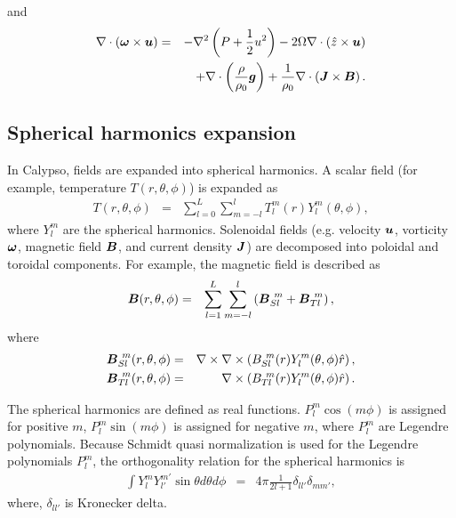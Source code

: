 %
and
\begin{eqnarray}
\nabla \cdot \left(\mbox{\boldmath$\omega$} \times \mbox{\boldmath$u$}\right)
 & = & -\nabla^{2} \left(P+\frac{1}{2}u^{2} \right) - 2 \Omega \nabla \cdot \left(\hat{z} \times \mbox{\boldmath$u$} \right)
\nonumber \\
 & & + \nabla \cdot \left( \frac{\rho}{\rho_{0}} \mbox{\boldmath$g$} \right)
     + \frac{1}{\rho_{0}} \nabla \cdot \left(\mbox{\boldmath$J$} \times \mbox{\boldmath$B$} \right)
\nonumber.
\end{eqnarray}


\subsection{Spherical harmonics expansion}
In Calypso, fields are expanded into spherical harmonics. A scalar field (for example, temperature $T(r, \theta, \phi)$) is expanded as
%
\begin{eqnarray}
T(r, \theta, \phi) &=& \sum_{l=0}^{L} \sum_{m=-l}^{l} T_{l}^{m}(r) Y_{l}^{m}(\theta,\phi),
\nonumber
\end{eqnarray}
where  $Y_{l}^{m}$ are the spherical harmonics. Solenoidal fields (e.g. velocity $\mbox{\boldmath$u$}$, vorticity $\mbox{\boldmath$\omega$}$, magnetic field $\mbox{\boldmath$B$}$, and current density $\mbox{\boldmath$J$}$) are decomposed into poloidal and toroidal components. For example, the magnetic field is described as 
\begin{eqnarray}
\mbox{\boldmath$B$}(r, \theta, \phi) & = & \sum_{l=1}^{L} \sum_{m=-l}^{l} 
\left( \mbox{\boldmath$B$}_{Sl}^{\ m} + \mbox{\boldmath$B$}_{Tl}^{\ m} \right),\nonumber
\end{eqnarray}
where
\begin{eqnarray}
\mbox{\boldmath$B$}_{Sl}^{\ m}(r, \theta, \phi) & = & \nabla \times \nabla \times \left( B_{Sl}^{\ m}(r) Y_{l}^{m}(\theta,\phi) \hat{r} \right),
\nonumber \\
\mbox{\boldmath$B$}_{Tl}^{\ m}(r, \theta, \phi) & = & \nabla \times \left( B_{Tl}^{\ m}(r) Y_{l}^{m}(\theta,\phi) \hat{r} \right).
\nonumber
\end{eqnarray}

The spherical harmonics are defined as real functions. $P_{l}^{m} \cos \left( m\phi \right)$ is assigned for positive $m$, $P_{l}^{m} \sin \left( m\phi \right)$ is assigned for negative $m$, where $P_{l}^{m}$ are Legendre polynomials. Because Schmidt quasi normalization is used for the Legendre polynomials $P_{l}^{m}$, the orthogonality relation for the spherical harmonics is 
%
\begin{eqnarray}
\int Y_{l}^{m} Y_{l'}^{m'} \sin \theta d\theta d\phi &=& 4\pi \frac{1}{2l+1} \delta_{ll'}\delta_{mm'},
\nonumber
\end{eqnarray}
%
where, $\delta_{ll'}$ is Kronecker delta.

